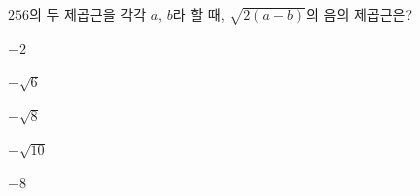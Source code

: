 $256$의 두 제곱근을 각각 $a$, $b$라 할 때, $\sqrt{2(a-b)}$의 음의 제곱근은? 
\begin{choices32}{\rule[-3ex]{0pt}{8ex}$-2$}{\rule[-3ex]{0pt}{8ex}$-\sqrt{6}$}{\rule[-3ex]{0pt}{8ex}$-\sqrt{8}$}{\rule[-3ex]{0pt}{8ex}$-\sqrt{10}$}{\rule[-3ex]{0pt}{8ex}$-8$}\end{choices32}
